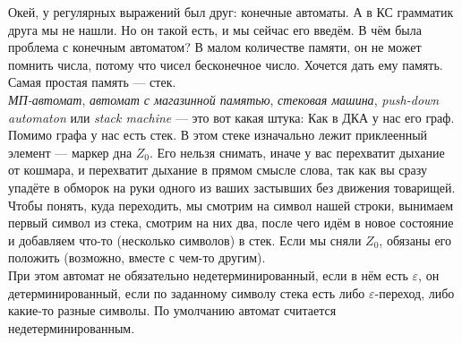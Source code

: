 \documentclass{article}
\begin{document}
\begin{itemize}
\begin{Comment}
        \end{Comment}
        \begin{Comment}
            Окей, у регулярных выражений был друг: конечные автоматы. А в КС грамматик друга мы не нашли. Но он такой есть, и мы сейчас его введём. В чём была проблема с конечным автоматом? В малом количестве памяти, он не может помнить числа, потому что чисел бесконечное число. Хочется дать ему память. Самая простая память --- стек.\\
            \textit{МП-автомат}, \textit{автомат с магазинной памятью}, \textit{стековая машина}, \textit{push-down automaton} или \textit{stack machine} --- это вот какая штука:
            Как в ДКА у нас его граф. Помимо графа у нас есть стек. В этом стеке изначально лежит приклеенный элемент --- маркер дна $Z_0$. Его нельзя снимать, иначе у вас перехватит дыхание от кошмара, и перехватит дыхание в прямом смысле слова, так как вы сразу упадёте в обморок на руки одного из ваших застывших без движения товарищей. Чтобы понять, куда переходить, мы смотрим на символ нашей строки, вынимаем первый символ из стека, смотрим на них два, после чего идём в новое состояние и добавляем что-то (несколько символов) в стек. Если мы сняли $Z_0$, обязаны его положить (возможно, вместе с чем-то другим).\\
            При этом автомат не обязательно недетерминированный, если в нём есть $\varepsilon$, он детерминированный, если по заданному символу стека есть либо $\varepsilon$-переход, либо какие-то разные символы. По умолчанию автомат считается недетерминированным.
        \end{Comment}
        \begin{Example}
            \begin{figure}[H]
\end{figure}
\end{Example}
\end{itemize}
\end{document}

